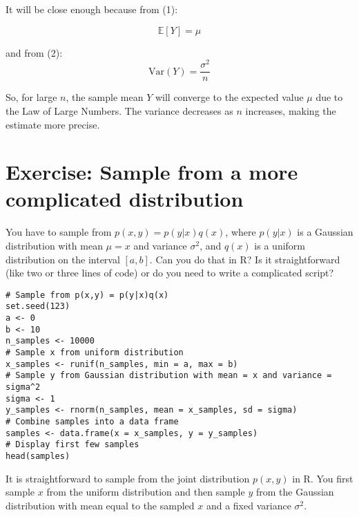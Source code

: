 \documentclass[11pt]{article}
\newif\ifshowanswers
\begin{document}
    It will be close enough because from (1):

    \[
      \mathbb{E}[Y] = \mu
    \]

    and from (2):
    \[
      \text{Var}(Y) = \frac{\sigma^2}{n}
    \]

    So, for large \(n\), the sample mean \(Y\) will converge to the expected value \(\mu\) due to the Law of Large Numbers. The variance decreases as \(n\) increases, making the estimate more precise.

    \section{Exercise: Sample from a more complicated distribution}

    You have to sample from $p(x,y)= p(y|x)q(x)$, where $p(y|x)$ is a Gaussian distribution with mean $\mu=x$ and variance $\sigma^2$, and $q(x)$ is a uniform distribution on the interval $[a, b]$.
    Can you do that in R?
    Is it straightforward (like two or three lines of code) or do you need to write a complicated script?

    \ifshowanswers
\begin{verbatim}
# Sample from p(x,y) = p(y|x)q(x)
set.seed(123)
a <- 0
b <- 10
n_samples <- 10000
# Sample x from uniform distribution
x_samples <- runif(n_samples, min = a, max = b)
# Sample y from Gaussian distribution with mean = x and variance = sigma^2
sigma <- 1
y_samples <- rnorm(n_samples, mean = x_samples, sd = sigma)
# Combine samples into a data frame
samples <- data.frame(x = x_samples, y = y_samples)
# Display first few samples
head(samples)
\end{verbatim}

    It is straightforward to sample from the joint distribution \(p(x,y)\) in R. You first sample \(x\) from the uniform distribution and then sample \(y\) from the Gaussian distribution with mean equal to the sampled \(x\) and a fixed variance \(\sigma^2\).
\end{document}
